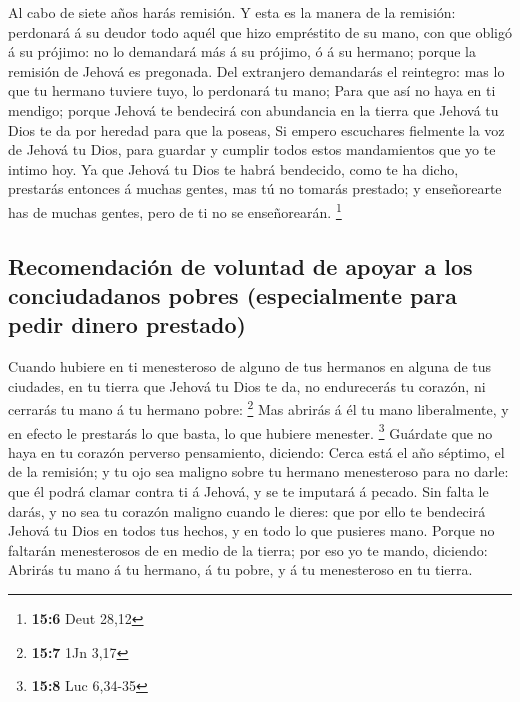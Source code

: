  Al cabo de siete años harás remisión.  Y
esta es la manera de la remisión: perdonará á su deudor todo aquél que
hizo empréstito de su mano, con que obligó á su prójimo: no lo demandará
más á su prójimo, ó á su hermano; porque la remisión de Jehová es
pregonada.  Del extranjero demandarás el reintegro: mas lo
que tu hermano tuviere tuyo, lo perdonará tu mano;  Para
que así no haya en ti mendigo; porque Jehová te bendecirá con abundancia
en la tierra que Jehová tu Dios te da por heredad para que la poseas,
 Si empero escuchares fielmente la voz de Jehová tu Dios,
para guardar y cumplir todos estos mandamientos que yo te intimo hoy.
 Ya que Jehová tu Dios te habrá bendecido, como te ha
dicho, prestarás entonces á muchas gentes, mas tú no tomarás prestado; y
enseñorearte has de muchas gentes, pero de ti no se enseñorearán.
\footnote{\textbf{15:6} Deut 28,12}

\hypertarget{recomendaciuxf3n-de-voluntad-de-apoyar-a-los-conciudadanos-pobres-especialmente-para-pedir-dinero-prestado}{%
\subsection{Recomendación de voluntad de apoyar a los conciudadanos
pobres (especialmente para pedir dinero
prestado)}\label{recomendaciuxf3n-de-voluntad-de-apoyar-a-los-conciudadanos-pobres-especialmente-para-pedir-dinero-prestado}}

 Cuando hubiere en ti menesteroso de alguno de tus
hermanos en alguna de tus ciudades, en tu tierra que Jehová tu Dios te
da, no endurecerás tu corazón, ni cerrarás tu mano á tu hermano pobre:
\footnote{\textbf{15:7} 1Jn 3,17}  Mas abrirás á él tu
mano liberalmente, y en efecto le prestarás lo que basta, lo que hubiere
menester. \footnote{\textbf{15:8} Luc 6,34-35}  Guárdate
que no haya en tu corazón perverso pensamiento, diciendo: Cerca está el
año séptimo, el de la remisión; y tu ojo sea maligno sobre tu hermano
menesteroso para no darle: que él podrá clamar contra ti á Jehová, y se
te imputará á pecado.  Sin falta le darás, y no sea tu
corazón maligno cuando le dieres: que por ello te bendecirá Jehová tu
Dios en todos tus hechos, y en todo lo que pusieres mano.
 Porque no faltarán menesterosos de en medio de la
tierra; por eso yo te mando, diciendo: Abrirás tu mano á tu hermano, á
tu pobre, y á tu menesteroso en tu tierra.

